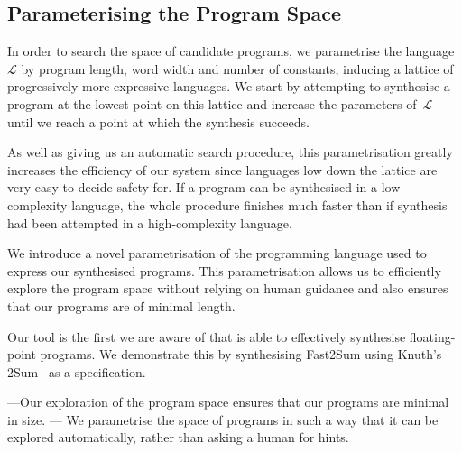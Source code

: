 \documentclass[preprint]{sigplanconf}
\theoremstyle{definition}
\begin{document}
\iffalse
\subsection{Parameterising the Program Space}


In order to search the space of candidate programs, we parametrise
the language~$\mathcal{L}$ by program length, word width and number of constants,
inducing a lattice of progressively
more expressive languages.  We start by attempting to synthesise
a program at the lowest point on this lattice and increase the
parameters of~$\mathcal{L}$ until we reach a point at which
the synthesis succeeds.

As well as giving us an automatic search procedure, this parametrisation
greatly increases the efficiency of our system since languages
low down the lattice are very easy to decide safety for.  If a program
can be synthesised in a low-complexity language, the whole procedure
finishes much faster than if synthesis had been attempted in a
high-complexity language.


We introduce a novel parametrisation of the programming language
used to express our synthesised programs.
This parametrisation allows us to efficiently explore the program space
without relying on human guidance and also ensures that our programs
are of minimal length.

Our tool is the first we are aware of that is able to effectively
synthesise floating-point programs. We demonstrate this by
synthesising {\sc Fast2Sum} using Knuth's {\sc 2Sum}~\cite{taocp2} as
a specification.

---Our exploration of the program space ensures that our programs are minimal in size.
--- We parametrise the space of programs in such a way that it can be explored automatically, rather than asking a human for hints.
\end{document}
